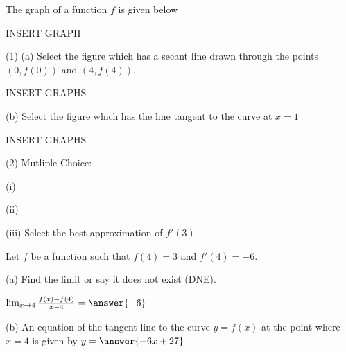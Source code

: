 \documentclass{ximera}
\begin{document}
\begin{exercise}
The graph of a function $f$ is given below

INSERT GRAPH

(1) (a) Select the figure which has a secant line drawn through the points $(0,f(0))$ and $(4,f(4))$.

INSERT GRAPHS

(b) Select the figure which has the line tangent to the curve at $x=1$

INSERT GRAPHS

(2) Mutliple Choice:

(i) \begin{multipleChoice}
\end{multipleChoice}

(ii) \begin{multipleChoice}
\end{multipleChoice}

(iii) Select the best approximation of $f'(3)$
\end{exercise}

\begin{exercise}
Let $f$ be a function such that $f(4)=3$ and $f'(4)=-6$.

(a) Find the limit or say it does not exist (DNE).

$\lim_{x} =$

(b) An equation of the tangent line to the curve $y=f(x)$ at the point where $x=4$ is given by $y=$
\end{exercise}
\end{document}
